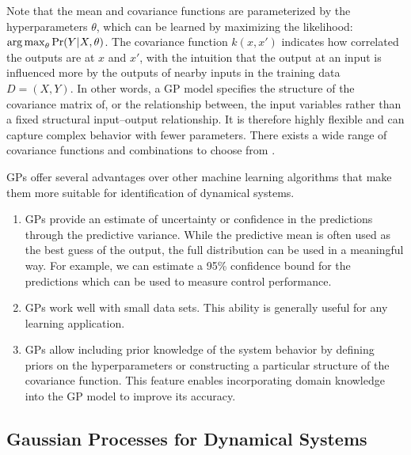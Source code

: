 Note that the mean and covariance functions are parameterized by the hyperparameters $\theta$, which can be learned by maximizing the likelihood: \(\operatorname*{arg\,max}_\theta \Pr(Y \vert X, \theta)\).
The covariance function \(k(x,x')\) indicates how correlated the outputs are at \(x\) and \(x'\), with the intuition that the output at an input is influenced more by the outputs of nearby inputs in the training data $D = (X, Y)$.
In other words, a GP model specifies the structure of the covariance matrix of, or the relationship between, the input variables rather than a fixed structural input--output relationship.
It is therefore highly flexible and can capture complex behavior with fewer parameters.
There exists a wide range of covariance functions and combinations to choose from \cite{Rasmussen2006}. 

GPs offer several advantages over other machine learning algorithms that make them more suitable for identification of dynamical systems.
\begin{enumerate}
\item GPs provide an estimate of uncertainty or confidence in the
  predictions through the predictive variance.  While the predictive mean is often used as the best guess of the output, the full distribution can be used in a meaningful way. For example, we can estimate a 95\% confidence bound for the predictions which can be used to measure control performance.
\item GPs work well with small data sets.  This ability is generally useful for any learning application.
\item GPs allow including prior knowledge of the system behavior by defining priors on the hyperparameters or constructing a particular structure of the covariance function.  This feature enables incorporating domain knowledge into the GP model to improve its accuracy.
\end{enumerate}

\subsection{Gaussian Processes for Dynamical Systems}
\label{S:intro-gp:control}

